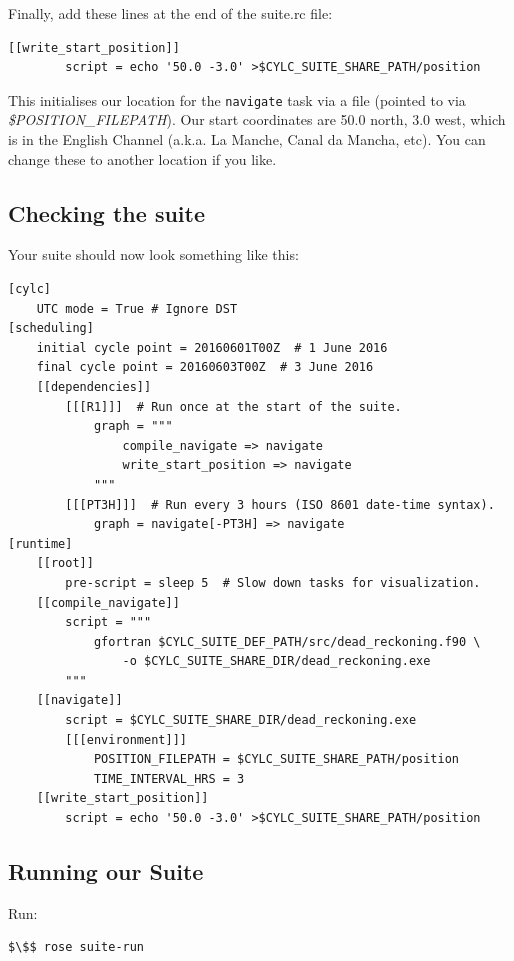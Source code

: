 Finally, add these lines at the end of the suite.rc file:

\lstset{language=suiterc}
\begin{lstlisting}[columns=fullflexible]
    [[write_start_position]]
        script = echo '50.0 -3.0' >$CYLC_SUITE_SHARE_PATH/position
\end{lstlisting}

This initialises our location for the \lstinline{navigate} task via a file (pointed to via {\em \$POSITION\_FILEPATH}). Our start coordinates are 50.0 north, 3.0 west, which is in the English Channel (a.k.a. La Manche, Canal da Mancha, etc). You can change these to another location if you like.

\subsection{Checking the suite}

Your suite should now look something like this:

\lstset{language=suiterc}
\begin{lstlisting}[columns=fullflexible]
[cylc]
    UTC mode = True # Ignore DST
[scheduling]
    initial cycle point = 20160601T00Z  # 1 June 2016
    final cycle point = 20160603T00Z  # 3 June 2016
    [[dependencies]]
        [[[R1]]]  # Run once at the start of the suite.
            graph = """
                compile_navigate => navigate
                write_start_position => navigate
            """
        [[[PT3H]]]  # Run every 3 hours (ISO 8601 date-time syntax).
            graph = navigate[-PT3H] => navigate
[runtime]
    [[root]]
        pre-script = sleep 5  # Slow down tasks for visualization.
    [[compile_navigate]]
        script = """
            gfortran $CYLC_SUITE_DEF_PATH/src/dead_reckoning.f90 \
                -o $CYLC_SUITE_SHARE_DIR/dead_reckoning.exe
        """
    [[navigate]]
        script = $CYLC_SUITE_SHARE_DIR/dead_reckoning.exe
        [[[environment]]]
            POSITION_FILEPATH = $CYLC_SUITE_SHARE_PATH/position
            TIME_INTERVAL_HRS = 3
    [[write_start_position]]
        script = echo '50.0 -3.0' >$CYLC_SUITE_SHARE_PATH/position
\end{lstlisting}

\subsection{Running our Suite}

Run:

\begin{lstlisting}[mathescape, language=bash]
$\$$ rose suite-run
\end{lstlisting}

